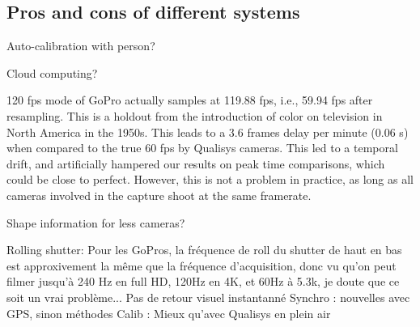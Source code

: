 \subsection{Pros and cons of different systems}



Auto-calibration with person?

Cloud computing?

120 fps mode of GoPro actually samples at 119.88 fps, i.e., 59.94 fps after resampling. This is a holdout from the introduction of color on television in North America in the 1950s. This leads to a 3.6 frames delay per minute (0.06 s) when compared to the true 60 fps by Qualisys cameras. This led to a temporal drift, and artificially hampered our results on peak time comparisons, which could be close to perfect. However, this is not a problem in practice, as long as all cameras involved in the capture shoot at the same framerate.

Shape information for less cameras?

Rolling shutter: Pour les GoPros, la fréquence de roll du shutter de haut en bas est approxivement la même que la fréquence d'acquisition, donc vu qu'on peut filmer jusqu'à 240 Hz en full HD, 120Hz en 4K, et 60Hz à 5.3k, je doute que ce soit un vrai problème...
Pas de retour visuel instantanné
Synchro : nouvelles avec GPS, sinon méthodes
Calib : Mieux qu'avec Qualisys en plein air

